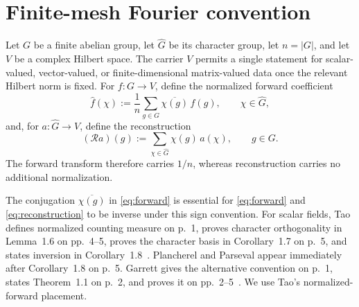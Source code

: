 \documentclass[11pt]{article}
\begin{document}
\section{Finite-mesh Fourier convention}
Let $G$ be a finite abelian group, let $\widehat G$ be its character group, let $n=|G|$, and let
$V$ be a complex Hilbert space.  The carrier $V$ permits a single statement for scalar-valued,
vector-valued, or finite-dimensional matrix-valued data once the relevant Hilbert norm is fixed.
For $f:G\to V$, define the normalized forward coefficient
\begin{equation}
  \widehat f(\chi)
  :=\frac{1}{n}\sum_{g\in G}\overline{\chi(g)}\,f(g),
  \qquad \chi\in\widehat G,
  \label{eq:forward}
\end{equation}
and, for $a:\widehat G\to V$, define the reconstruction
\begin{equation}
  (\mathcal R a)(g)
  :=\sum_{\chi\in\widehat G}\chi(g)\,a(\chi),
  \qquad g\in G.
  \label{eq:reconstruction}
\end{equation}
The forward transform therefore carries $1/n$, whereas reconstruction carries no additional
normalization.

The conjugation $\overline{\chi(g)}$ in \eqref{eq:forward} is essential for
\eqref{eq:forward} and \eqref{eq:reconstruction} to be inverse under this sign convention.  For
scalar fields, Tao defines normalized counting measure on p.~1, proves character orthogonality in
Lemma~1.6 on pp.~4--5, proves the character basis in Corollary~1.7 on p.~5, and states inversion in
Corollary~1.8~\cite{Tao2007FiniteAbelian}.  Plancherel and Parseval appear immediately after
Corollary~1.8 on p.~5.  Garrett gives the alternative convention on p.~1, states Theorem~1.1 on
p.~2, and proves it on pp.~2--5~\cite{Garrett2019FiniteAbelian}.  We use Tao's
normalized-forward placement.
\end{document}
